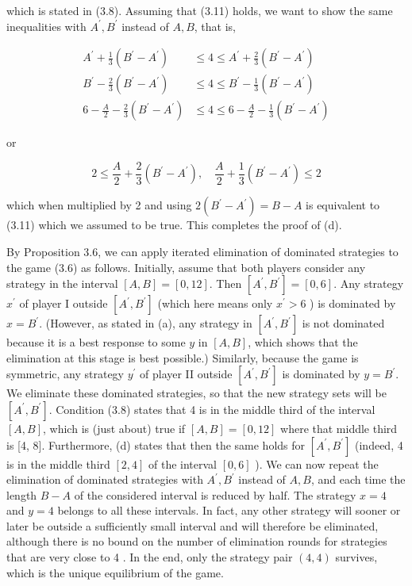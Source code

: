 \documentclass[12pt]{article}
\begin{document}
which is stated in (3.8). Assuming that (3.11) holds, we want to show the same inequalities with $A^{\prime}, B^{\prime}$ instead of $A, B$, that is,

$$
\begin{aligned}
A^{\prime}+\frac{1}{3}\left(B^{\prime}-A^{\prime}\right) & \leq 4 \leq A^{\prime}+\frac{2}{3}\left(B^{\prime}-A^{\prime}\right) \\
B^{\prime}-\frac{2}{3}\left(B^{\prime}-A^{\prime}\right) & \leq 4 \leq B^{\prime}-\frac{1}{3}\left(B^{\prime}-A^{\prime}\right) \\
6-\frac{A}{2}-\frac{2}{3}\left(B^{\prime}-A^{\prime}\right) & \leq 4 \leq 6-\frac{A}{2}-\frac{1}{3}\left(B^{\prime}-A^{\prime}\right)
\end{aligned}
$$

or

$$
2 \leq \frac{A}{2}+\frac{2}{3}\left(B^{\prime}-A^{\prime}\right), \quad \frac{A}{2}+\frac{1}{3}\left(B^{\prime}-A^{\prime}\right) \leq 2
$$

which when multiplied by 2 and using $2\left(B^{\prime}-A^{\prime}\right)=B-A$ is equivalent to (3.11) which we assumed to be true. This completes the proof of (d).

By Proposition 3.6, we can apply iterated elimination of dominated strategies to the game (3.6) as follows. Initially, assume that both players consider any strategy in the interval $[A, B]=[0,12]$. Then $\left[A^{\prime}, B^{\prime}\right]=[0,6]$. Any strategy $x^{\prime}$ of player I outside $\left[A^{\prime}, B^{\prime}\right]$ (which here means only $x^{\prime}>6$ ) is dominated by $x=B^{\prime}$. (However, as stated in (a), any strategy in $\left[A^{\prime}, B^{\prime}\right]$ is not dominated because it is a best response to some $y$ in $[A, B]$, which shows that the elimination at this stage is best possible.) Similarly, because the game is symmetric, any strategy $y^{\prime}$ of player II outside $\left[A^{\prime}, B^{\prime}\right]$ is dominated by $y=B^{\prime}$. We eliminate these dominated strategies, so that the new strategy sets will be $\left[A^{\prime}, B^{\prime}\right]$. Condition (3.8) states that 4 is in the middle third of the interval $[A, B]$, which is (just about) true if $[A, B]=[0,12]$ where that middle third is [4, 8]. Furthermore, (d) states that then the same holds for $\left[A^{\prime}, B^{\prime}\right]$ (indeed, 4 is in the middle third $[2,4]$ of the interval $[0,6]$ ). We can now repeat the elimination of dominated strategies with $A^{\prime}, B^{\prime}$ instead of $A, B$, and each time the length $B-A$ of the considered interval is reduced by half. The strategy $x=4$ and $y=4$ belongs to all these intervals. In fact, any other strategy will sooner or later be outside a sufficiently small interval and will therefore be eliminated, although there is no bound on the number of elimination rounds for strategies that are very close to 4 . In the end, only the strategy pair $(4,4)$ survives, which is the unique equilibrium of the game.
\end{document}
